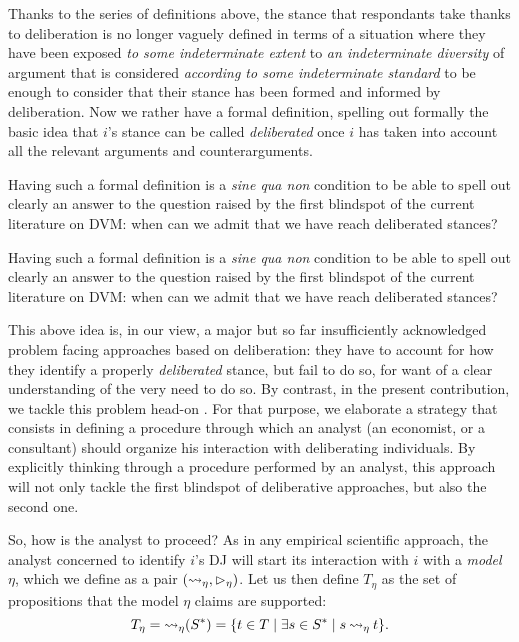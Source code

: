 \documentclass[version=3.21, pagesize, twoside=off, bibliography=totoc, DIV=calc, fontsize=12pt, a4paper, french, english]{scrartcl}
\begin{document}
Thanks to the series of definitions above, the stance that respondants take thanks to deliberation is no longer vaguely defined in terms of a situation where they have been exposed \emph{to some indeterminate extent} to \emph{an indeterminate diversity} of argument that is considered \emph{according to some indeterminate standard} to be enough to consider that their stance has been formed and informed by deliberation. Now we rather have a formal definition, spelling out formally the basic idea that $i$'s stance can be called \emph{deliberated} once $i$ has taken into account all the relevant arguments and counterarguments. 

Having such a formal definition is a \emph{sine qua non} condition to be able to spell out clearly an answer to the question raised by the first blindspot of the current literature on DVM: when can we admit that we have reach deliberated stances?

Having such a formal definition is a \emph{sine qua non} condition to be able to spell out clearly an answer to the question raised by the first blindspot of the current literature on DVM: when can we admit that we have reach deliberated stances?

This above idea is, in our view, a major but so far insufficiently acknowledged problem facing approaches based on deliberation: they have to account for how they identify a properly \emph{deliberated} stance, but fail to do so, for want of a clear understanding of the very need to do so. By contrast, in the present contribution, we tackle this problem head-on . For that purpose, we elaborate a strategy that consists in defining a procedure through which an analyst (an economist, or a consultant) should organize his interaction with deliberating individuals. By explicitly thinking through a procedure performed by an analyst, this approach will not only tackle the first blindspot of deliberative approaches, but also the second one.

So, how is the analyst to proceed? As in any empirical scientific approach, the analyst concerned to identify $i$'s \ac{DJ} will start its interaction with $i$ with a \emph{model} $\eta$, which we define as a pair $(\mathbin{\rightsquigarrow_{\eta}}, \mathbin{\vartriangleright_{\eta}})$.  Let us then define $T_\eta$ as the set of propositions that the model $\eta$ claims are supported:
\begin{equation}
	T_\eta = {\mleadsto}(\allargs) = \set{t \in T \suchthat \exists \ar \in \allargs \suchthat \ar \mleadsto t}.
\end{equation}
\end{document}

